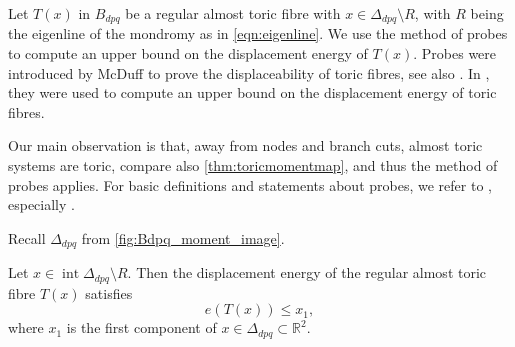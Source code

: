 \documentclass[12pt,a4paper,abstract=true,final]{scrartcl}
\DeclareMathOperator{\interior}{int}
\begin{document}
Let $T(x)$ in $B_{dpq}$ be a regular almost toric fibre with $x \in \Delta_{dpq} \setminus R$, with $R$ being the eigenline of the mondromy as in \eqref{eqn:eigenline}.
We use the method of probes to compute an upper bound on the displacement energy of $T(x)$.
Probes were introduced by McDuff \cite{mcduff2011displacing} to prove the displaceability of toric fibres, see also \cite{AbrBorMcD14}.
In \cite{brendel2020real}, they were used to compute an upper bound on the displacement energy of toric fibres.

Our main observation is that, away from nodes and branch cuts, almost toric systems are toric, compare also \cref{thm:toricmomentmap}, and thus the method of probes applies.
For basic definitions and statements about probes, we refer to \cite{mcduff2011displacing}, especially \cite[Definition 2.3, Lemma 2.4]{mcduff2011displacing}.

Recall $Δ_{dpq}$ from \cref{fig:Bdpq_moment_image}.


\begin{lemma}
    \label{thm:upper_bound}
    Let $x \in \interior \Delta_{dpq} \setminus R$.
Then the displacement energy of the regular almost toric fibre $T(x)$ satisfies
    \[ e(T(x))\leq x_1, \]
    where $x_1$ is the first component of $x \in \Delta_{dpq} \subset \mathbb{R}^2$.
\end{lemma}
\end{document}
